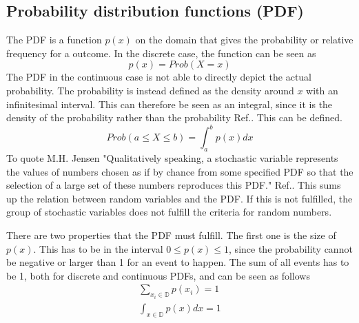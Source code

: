 \documentclass[%
twoside,                 %
final,                   %
chapterprefix=true,      %
open=right               %
10pt]{book}
\begin{document}
\subsection{Probability distribution functions (PDF)}
The PDF is a function $p(x)$ on the domain that gives the probability or relative frequency for a outcome. In the discrete case, the function can be seen as
\begin{equation}
p(x) = Prob(X=x)
\end{equation}
The PDF in the continuous case is not able to directly depict the actual probability. The probability is instead defined as the density around $x$ with an infinitesimal interval. This can therefore be seen as an integral, since it is the density of the probability rather than the probability Ref.\cite{hjorth2011computational}. This can be defined.
\begin{equation}
 Prob(a\leq X \leq b) = \int^b_a p(x)dx
\end{equation}
To quote M.H. Jensen "Qualitatively speaking, a stochastic variable represents the values of numbers chosen as if by chance from some specified PDF so that the selection of a large set of these numbers reproduces this PDF." Ref.\cite{hjorth2011computational}. This sums up the relation between random variables and the PDF. If this is not fulfilled, the group of stochastic variables does not fulfill the criteria for random numbers. 

There are two properties that the PDF must fulfill. The first one is the size of $p(x)$. This has to be in the interval $0\leq p(x) \leq 1$, since the probability cannot be negative or larger than 1 for an event to happen. The sum of all events has to be 1, both for discrete and continuous PDFs, and can be seen as follows
\begin{equation}
	\begin{aligned}
    \sum_{x_i \in \mathbb{D}} p(x_i) = 1\\
    \int_{x \in \mathbb{D}} p(x) dx = 1
	\end{aligned}
\end{equation} 
\end{document}
